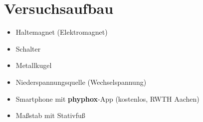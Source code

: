 \documentclass[11pt,a4paper]{scrartcl}
\begin{document}
	\section*{Versuchsaufbau}
	
	\begin{materialbox}
		\begin{itemize}
			\item Haltemagnet (Elektromagnet)
			\item Schalter
			\item Metallkugel
			\item Niederspannungsquelle (Wechselspannung)
			\item Smartphone mit \textbf{phyphox}-App (kostenlos, RWTH Aachen)
			\item Maßstab mit Stativfuß
		\end{itemize}
	\end{materialbox}
	
	\vspace{0.5cm}
	
\end{document}
